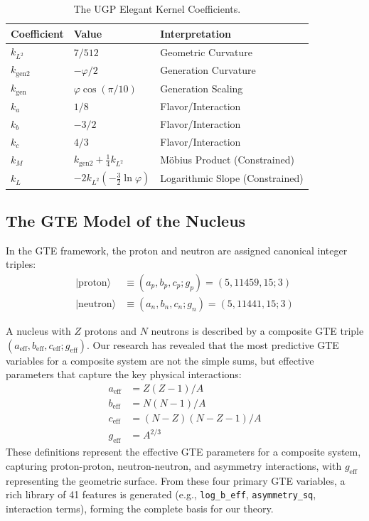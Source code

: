 \documentclass[9pt,twocolumn]{extarticle}
\newcommand{\eff}{\text{eff}}
\newcommand{\ket}[1]{\ensuremath{|#1\rangle}}
\newcommand{\fphi}{\varphi}
\begin{document}
\begin{table}[h]
\centering
\caption{The UGP Elegant Kernel Coefficients.}
\label{tab:elegant_kernel}
\renewcommand{\arraystretch}{1.2}
\small
\begin{tabular}{@{}llp{2.5cm}@{}}
\toprule
\textbf{Coefficient} & \textbf{Value} & \textbf{Interpretation} \\
\midrule
$k_{L^2}$ & $7/512$ & Geometric Curvature \\
$k_{\text{gen2}}$ & $-\fphi/2$ & Generation Curvature \\
$k_{\text{gen}}$ & $\varphi\cos(\pi/10)$ & Generation Scaling \\
$k_a$ & $1/8$ & Flavor/Interaction \\
$k_b$ & $-3/2$ & Flavor/Interaction \\
$k_c$ & $4/3$ & Flavor/Interaction \\
$k_M$ & $k_{\text{gen2}} + \frac{1}{4}k_{L^2}$ & Möbius Product (Constrained) \\
$k_L$ & $-2k_{L^2}(-\frac{3}{2}\ln\fphi)$ & Logarithmic Slope (Constrained) \\
\bottomrule
\end{tabular}
\end{table}

\subsection{The GTE Model of the Nucleus}
In the GTE framework, the proton and neutron are assigned canonical integer triples:
\begin{align*}
    \ket{\text{proton}} &\equiv (a_p, b_p, c_p; g_p) = (5, 11459, 15; 3) \\
    \ket{\text{neutron}} &\equiv (a_n, b_n, c_n; g_n) = (5, 11441, 15; 3)
\end{align*}

A nucleus with $Z$ protons and $N$ neutrons is described by a composite GTE triple $(a_{\eff}, b_{\eff}, c_{\eff}; g_{\eff})$. Our research has revealed that the most predictive GTE variables for a composite system are not the simple sums, but effective parameters that capture the key physical interactions:
\begin{align}
    a_{\eff} &= Z(Z-1)/A \label{eq:a_comp_new} \\
    b_{\eff} &= N(N-1)/A \label{eq:b_comp_new} \\
    c_{\eff} &= (N-Z)(N-Z-1)/A \label{eq:c_comp_new} \\
    g_{\eff} &= A^{2/3} \label{eq:g_comp_new}
\end{align}
These definitions represent the effective GTE parameters for a composite system, capturing proton-proton, neutron-neutron, and asymmetry interactions, with $g_{\eff}$ representing the geometric surface. From these four primary GTE variables, a rich library of 41 features is generated (e.g., \texttt{log\_b\_eff}, \texttt{asymmetry\_sq}, interaction terms), forming the complete basis for our theory.
\end{document}
